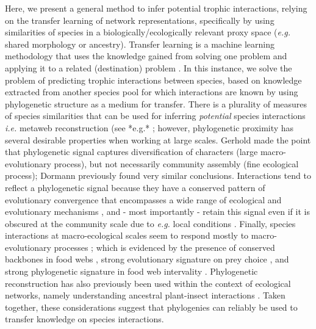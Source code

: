 Here, we present a general method to infer potential trophic
interactions, relying on the transfer learning of network
representations, specifically by using similarities of species in a
biologically/ecologically relevant proxy space (\emph{e.g.} shared
morphology or ancestry). Transfer learning is a machine learning
methodology that uses the knowledge gained from solving one problem and
applying it to a related (destination) problem \cite{Torrey2010TraLea,
Pan2010SurTra}. In this instance, we solve the problem of predicting
trophic interactions between species, based on knowledge extracted from
another species pool for which interactions are known by using
phylogenetic structure as a medium for transfer. There is a plurality of
measures of species similarities that can be used for inferring
\emph{potential} species interactions \emph{i.e.} metaweb reconstruction
(see *e.g.* \cite{Morales-Castilla2015InfBio}; however, phylogenetic
proximity has several desirable properties when working at large scales.
Gerhold\cite{Gerhold2015PhyPat} made the point that phylogenetic signal captures
diversification of characters (large macro-evolutionary process), but
not necessarily community assembly (fine ecological process);
Dormann\cite{Dormann2010EvoCli} previously found very similar conclusions.
Interactions tend to reflect a phylogenetic signal because they have a
conserved pattern of evolutionary convergence that encompasses a wide
range of ecological and evolutionary mechanisms \cite{Mouquet2012EcoAdv,
Cavender-Bares2009MerCom}, and - most importantly - retain this
signal even if it is obscured at the community scale due to \emph{e.g.}
local conditions \cite{Poisot2018IntRet, Hutchinson2017CopSig}.
Finally, species interactions at macro-ecological scales seem to respond
mostly to macro-evolutionary processes \cite{Price2003MacThe}; which is
evidenced by the presence of conserved backbones in food webs
\cite{BramonMora2018IdeCom, DallaRiva2016ExpEvo}, strong evolutionary
signature on prey choice \cite{Stouffer2012EvoCon}, and strong
phylogenetic signature in food web intervality \cite{Eklof2016PhyCom}.
Phylogenetic reconstruction has also previously been used within the
context of ecological networks, namely understanding ancestral
plant-insect interactions \cite{Braga2021PhyRec}. Taken together, these
considerations suggest that phylogenies can reliably be used to transfer
knowledge on species interactions.

